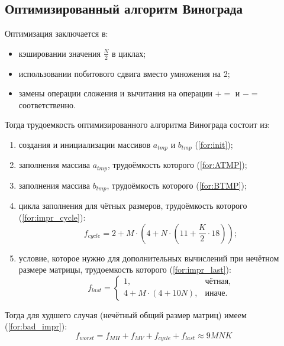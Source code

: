 \subsection{Оптимизированный алгоритм Винограда}

Оптимизация заключается в:
\begin{itemize}
	\item кэшировании значения $\frac{N}{2}$ в циклах;
    \item использовании побитового сдвига вместо умножения на 2;
    \item замены операции сложения и вычитания на операции $+=$ и $-=$ соответственно. \newline
\end{itemize}

Тогда трудоемкость оптимизированного алгоритма Винограда состоит из:

\begin{enumerate}[label=\arabic*)]
	\item создания и инициализации массивов $a_{tmp}$ и $b_{tmp}$ (\ref{for:init});

	\item заполнения массива $a_{tmp}$, трудоёмкость которого (\ref{for:ATMP});

	\item заполнения массива  $b_{tmp}$, трудоёмкость которого (\ref{for:BTMP});

	\item цикла заполнения для чётных размеров, трудоёмкость которого (\ref{for:impr_cycle}):
	\begin{equation}
		\label{for:impr_cycle}
		f_{cycle} =2 + M \cdot (4 + N \cdot (11 + \frac{K}{2} \cdot 18));
	\end{equation}

	\item условие, которое нужно для дополнительных вычислений при нечётном размере матрицы, трудоемкость которого (\ref{for:impr_last}):
	\begin{equation}
		\label{for:impr_last}
		f_{last} =
		\begin{cases}
			1, & \text{чётная,}\\
			4 + M \cdot (4 + 10N), & \text{иначе.}
		\end{cases}
	\end{equation}
\end{enumerate}

Тогда для худшего случая (нечётный общий размер матриц) имеем (\ref{for:bad_impr}):
\begin{equation}
	\label{for:bad_impr}
	f_{worst} = f_{MH} + f_{MV} + f_{cycle} + f_{last} \approx 9MNK
\end{equation}

